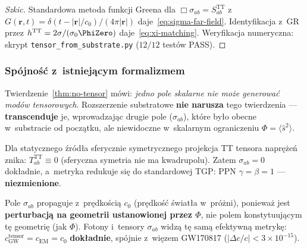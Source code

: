 \begin{proof}[Szkic]
Standardowa metoda funkcji Greena dla $\Box\sigma_{ab} = S_{ab}^{\mathrm{TT}}$
z~$G(\mathbf{r},t) = \delta(t-|\mathbf{r}|/c_0)/(4\pi|\mathbf{r}|)$
daje~\eqref{eq:sigma-far-field}. Identyfikacja z~GR
przez $h^{\mathrm{TT}} = 2\sigma/(\sigma_0\PhiZero)$
daje~\eqref{eq:xi-matching}.
Weryfikacja numeryczna: skrypt \texttt{tensor\_from\_substrate.py}
($12/12$ test\'ow PASS).
\end{proof}

\subsubsection{Sp\'ojno\'s\'c z~istniej\k{a}cym formalizmem}

\begin{remark}%
\label{rem:no-tensor-transcended}
Twierdzenie~\ref{thm:no-tensor} m\'owi:
\emph{jedno pole skalarne nie mo\.ze generowa\'c mod\'ow tensorowych}.
Rozszerzenie substratowe \textbf{nie narusza} tego twierdzenia ---
\textbf{transcenduje} je, wprowadzaj\k{a}c drugie pole ($\sigma_{ab}$),
kt\'ore by\l{}o obecne w~substracie od pocz\k{a}tku,
ale niewidoczne w~skalarnym ograniczeniu $\Phi = \langle\hat{s}^2\rangle$.
\end{remark}

\begin{remark}%
\label{rem:sigma-ppn}
Dla statycznego \'zr\'od\l{}a sferycznie symetrycznego
projekcja TT tensora napr\k{e}\.ze\'n znika:
$T_{ab}^{\mathrm{TT}} \equiv 0$ (sferyczna symetria nie ma kwadrupolu).
Zatem $\sigma_{ab} = 0$ dok\l{}adnie, a~metryka
redukuje si\k{e} do standardowej TGP:
PPN $\gamma = \beta = 1$ --- \textbf{niezmienione}.
\end{remark}

\begin{remark}%
\label{rem:cGW-tensor}
Pole $\sigma_{ab}$ propaguje z~pr\k{e}dko\'sci\k{a} $c_0$
(pr\k{e}dko\'s\'c \'swiat\l{}a w~pr\'o\.zni), poniewa\.z
jest \textbf{perturbacj\k{a} na geometrii ustanowionej przez $\Phi$},
nie polem konstytuuj\k{a}cym t\k{e} geometri\k{e} (jak $\Phi$).
Fotony i~tensory $\sigma_{ab}$ widz\k{a} t\k{e} sam\k{a}
efektywn\k{a} metryk\k{e}:
$c_{\mathrm{GW}}^{\mathrm{tensor}} = c_{\mathrm{EM}} = c_0$
\textbf{dok\l{}adnie}, sp\'ojnie z~wi\k{e}zem GW170817
($|\Delta c/c| < 3 \times 10^{-15}$).
\end{remark}

